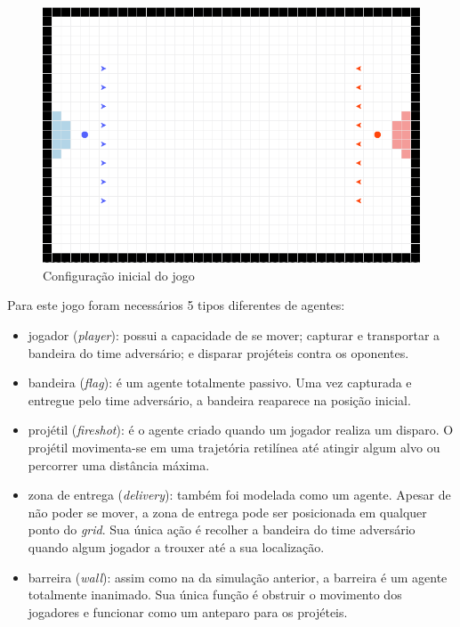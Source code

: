 \documentclass[preprint,12pt]{elsarticle}
\begin{document}
\begin{figure}[H]
	\centering
	\includegraphics[totalheight=5cm]{figures/flag-ini.png}
	\caption{Configuração inicial do jogo}
	\label{fig:flag-ini}
\end{figure}

Para este jogo foram necessários 5 tipos diferentes de agentes:

\begin{itemize}
	\setlength\itemsep{0pt}
	\item jogador (\textit{player}): possui a capacidade de se mover; capturar e transportar a bandeira do time adversário; e disparar projéteis contra os oponentes.
	\item bandeira (\textit{flag}): é um agente totalmente passivo. Uma vez capturada e entregue pelo time adversário, a bandeira reaparece na posição inicial.
	\item projétil (\textit{fireshot}): é o agente criado quando um jogador realiza um disparo. O projétil movimenta-se em uma trajetória retilínea até atingir algum alvo ou percorrer uma distância máxima. 
	\item zona de entrega (\textit{delivery}): também foi modelada como um agente. Apesar de não poder se mover, a zona de entrega pode ser posicionada em qualquer ponto do \textit{grid}. Sua única ação é recolher a bandeira do time adversário quando algum jogador a trouxer até a sua localização.
	\item barreira (\textit{wall}): assim como na da simulação anterior, a barreira é um agente totalmente inanimado. Sua única função é obstruir o movimento dos jogadores e funcionar como um anteparo para os projéteis.
\end{itemize}
\end{document}
